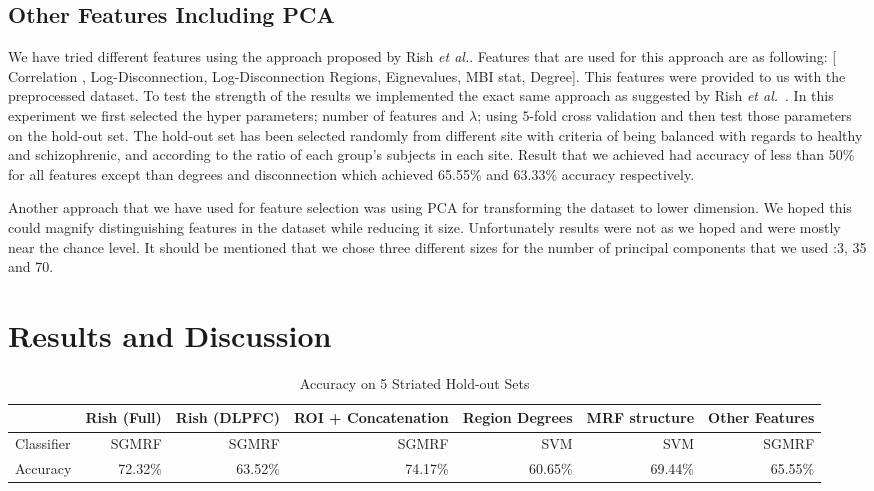 \documentclass{article} %
\begin{document}
\subsection{Other Features Including PCA}
We have tried different features using the approach proposed by Rish \emph{et al.}. Features that are used for this approach are as following: [ Correlation , Log-Disconnection, Log-Disconnection Regions, Eignevalues, MBI stat, Degree].
This features were provided to us with the preprocessed dataset. To test the strength of the results we implemented the exact same approach as suggested by Rish \emph{et al.}~\cite{Rish_2013}. In this experiment we first selected the hyper parameters; number of features and $\lambda$; using $5$-fold cross validation and then test those parameters on the hold-out set. The hold-out set has been selected randomly from different site with criteria of being balanced with regards to healthy and schizophrenic, and according to the ratio of each group's subjects in each site. Result that we achieved had accuracy of less than 50\% for all features except than degrees and disconnection which achieved 65.55\% and 63.33\% accuracy respectively. 

Another approach that we have used for feature selection was using PCA for transforming the dataset to lower dimension. We hoped this could magnify distinguishing features in the dataset while reducing it size. Unfortunately results were not as we hoped and were mostly near the chance level. It should be mentioned that we chose three different sizes for the number of principal components that we used :3, 35 and 70.   


\section{Results and Discussion}

\begin{table}[hpt]\footnotesize
\begin{center}
    \begin{tabular}{| l | r | r | r | r | r | r |}
    \hline
                & Rish (Full) & Rish (DLPFC) & ROI + Concatenation & Region Degrees & MRF structure & Other Features \\ \hline
    Classifier  & SGMRF       & SGMRF        & SGMRF               & SVM            & SVM           & SGMRF          \\ \hline
    Accuracy    & 72.32\%     & 63.52\%      & 74.17\%             & 60.65\%        & 69.44\%       & 65.55\%        \\ \hline
    \end{tabular}
    \caption{Accuracy on 5 Striated Hold-out Sets}
     \label{fig:holdout_table}
\end{center}
\end{table}
\end{document}
